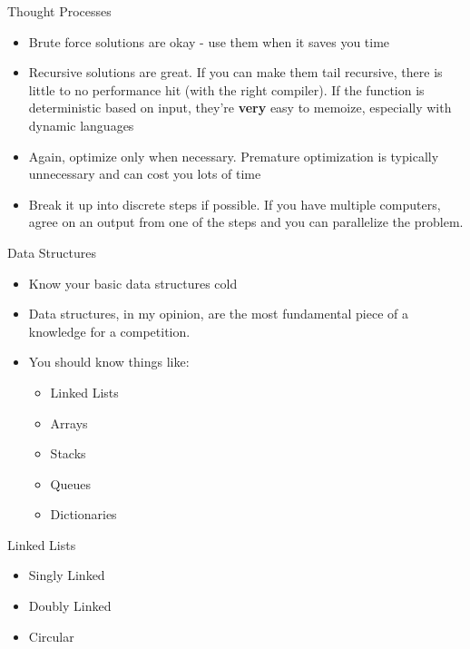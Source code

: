 \documentclass{beamer}
\begin{document}
\begin{frame}{Thought Processes}
  \begin{centering}
    \begin{itemize}
      \item Brute force solutions are okay - use them when it saves you time
      \item Recursive solutions are great. If you can make them tail recursive, there is little to no performance hit (with the right compiler). If the function is deterministic based on input, they're \textbf{very} easy to memoize, especially with dynamic languages
      \item Again, optimize only when necessary. Premature optimization is typically unnecessary and can cost you lots of time
      \item Break it up into discrete steps if possible. If you have multiple computers, agree on an output from one of the steps and you can parallelize the problem.
    \end{itemize}
  \end{centering}
\end{frame}

\begin{frame}{Data Structures}
  \begin{centering}
    \begin{itemize}
      \item Know your basic data structures cold
      \item Data structures, in my opinion, are the most fundamental piece of a knowledge for a competition.
      \item You should know things like:
      \begin{itemize}
        \item Linked Lists
        \item Arrays
        \item Stacks
        \item Queues
        \item Dictionaries
      \end{itemize}
    \end{itemize}
  \end{centering}
\end{frame}

\begin{frame}{Linked Lists}
  \begin{centering}
    \begin{itemize}
      \item Singly Linked
      \item Doubly Linked
      \item Circular
    \end{itemize}
  \end{centering}
\end{frame}
\end{document}
